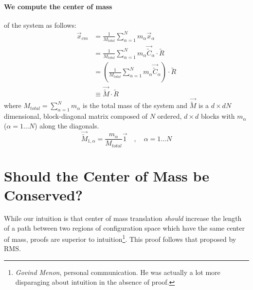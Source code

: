 \documentclass[letterpaper,12pt]{article}
\newcommand{\scmat}[1]{\vec{\utilde{#1}}}
\newcommand{\cvec}[1]{\utilde{#1}}
\newcommand{\svec}[1]{\vec{#1}}
\newcommand{\laeq}[1]{\label{eqn:#1}}
\begin{document}
\paragraph{We compute the center of mass} \hspace{-1em} of the system as follows:
\begin{equation}\laeq{computeCM}
\begin{aligned}
\svec{x}_{cm} &= \frac{1}{M_{total}}\sum_{\alpha = 1}^{N} m_{\alpha} \svec{x}_{\alpha} \\
 &= \frac{1}{M_{total}} \sum_{\alpha = 1}^{N} m_{\alpha} \scmat{C}_{\alpha} \cdot \cvec{R} \\
 &= \left( \frac{1}{M_{total}} \sum_{\alpha = 1}^{N} m_{\alpha} \scmat{C}_{\alpha} \right) \cdot \cvec{R} \\
 &\equiv \scmat{M} \cdot \cvec{R}
\end{aligned}
\end{equation}
where $M_{total}=\sum_{\alpha = 1}^{N} m_{\alpha}$ is the total mass of the system and $\scmat{M}$ is a $d \times d N$ dimensional, block-diagonal matrix composed of $N$ ordered, $d \times d$ blocks with $m_{\alpha}$ ($\alpha = 1 \ldots N $) along the diagonals.
\begin{equation} \laeq{mComponents}
\scmat{M}_{1,\alpha} = \frac{m_{\alpha}}{M_{total}} \svec{1}\quad , \quad \alpha = 1 \ldots N
\end{equation}

\section{Should the Center of Mass be Conserved?} \label{sec:shouldConserveCM}
While our intuition is that center of mass translation \emph{should} increase the length of a path between two regions of configuration space which have the same center of mass, proofs are superior to intuition\footnote{\emph{Govind Menon}, personal communication. He was actually a lot more disparaging about intuition in the absence of proof.}. This proof follows that proposed by RMS.
\end{document}
